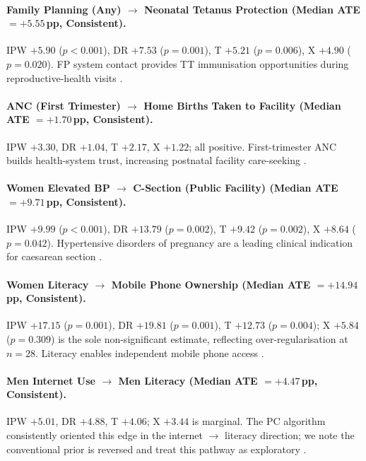 \documentclass[12pt,a4paper]{report}
\begin{document}
\paragraph{Family Planning (Any) $\to$ Neonatal Tetanus Protection
  (Median ATE $= +5.55$\,pp, Consistent).}
IPW $+5.90$ ($p<0.001$), DR $+7.53$ ($p=0.001$), T $+5.21$ ($p=0.006$),
X $+4.90$ ($p=0.020$).
FP system contact provides TT immunisation opportunities during reproductive-health
visits \citep{bhatia2023antenatal}.

\paragraph{ANC (First Trimester) $\to$ Home Births Taken to Facility
  (Median ATE $= +1.70$\,pp, Consistent).}
IPW $+3.30$, DR $+1.04$, T $+2.17$, X $+1.22$; all positive.
First-trimester ANC builds health-system trust, increasing postnatal facility
care-seeking \citep{nfhs5report}.

\paragraph{Women Elevated BP $\to$ C-Section (Public Facility)
  (Median ATE $= +9.71$\,pp, Consistent).}
IPW $+9.99$ ($p<0.001$), DR $+13.79$ ($p=0.002$), T $+9.42$ ($p=0.002$),
X $+8.64$ ($p=0.042$).
Hypertensive disorders of pregnancy are a leading clinical indication for
caesarean section \citep{who2011hypertension}.

\paragraph{Women Literacy $\to$ Mobile Phone Ownership
  (Median ATE $= +14.94$\,pp, Consistent).}
IPW $+17.15$ ($p=0.001$), DR $+19.81$ ($p=0.001$), T $+12.73$ ($p=0.004$);
X $+5.84$ ($p=0.309$) is the sole non-significant estimate, reflecting
over-regularisation at $n=28$.
Literacy enables independent mobile phone access \citep{gsma2020connected}.

\paragraph{Men Internet Use $\to$ Men Literacy
  (Median ATE $= +4.47$\,pp, Consistent).}
IPW $+5.01$, DR $+4.88$, T $+4.06$; X $+3.44$ is marginal.
The PC algorithm consistently oriented this edge in the internet $\to$ literacy
direction; we note the conventional prior is reversed and treat this pathway
as exploratory \citep{bbc2019literacy}.
\end{document}
